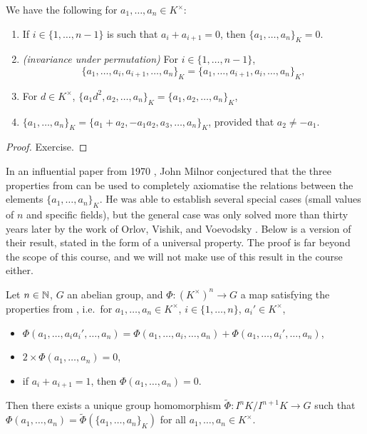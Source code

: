 \documentclass[12pt, leqno, british]{amsart}
\begin{document}
\begin{cor}\label{C:K-theory-axioms}
We have the following for $a_1, \ldots, a_n \in K^\times$:
\begin{enumerate}
\item If $i \in \lbrace 1, \ldots, n-1 \rbrace$ is such that $a_i + a_{i+1} = 0$, then $\lbrace a_1, \ldots, a_n \rbrace_K = 0$.
\item\label{it:permutation-invariance} \textit{(invariance under permutation)} For $i \in \lbrace 1, \ldots, n-1 \rbrace$, $$\lbrace a_1, \ldots, a_i, a_{i+1}, \ldots, a_n \rbrace_K = \lbrace a_1, \ldots, a_{i+1}, a_i, \ldots, a_n \rbrace_K,$$
\item\label{it:scale-square-invariance} For $d \in K^\times$, $\lbrace a_1d^2, a_2, \ldots, a_n \rbrace_K = \lbrace a_1, a_2, \ldots, a_n \rbrace_K$,
\item $\lbrace a_1, \ldots, a_n \rbrace_K = \lbrace a_1 + a_2, -a_1a_2, a_3, \ldots, a_n \rbrace_K$, provided that $a_2 \neq -a_1$.
\end{enumerate}
\end{cor}
\begin{proof}
Exercise.
\end{proof}
In an influential paper from 1970 \cite{Milnor}, John Milnor conjectured that the three properties from  can be used to completely axiomatise the relations between the elements $\lbrace a_1, \ldots, a_n \rbrace_K$.
He was able to establish several special cases (small values of $n$ and specific fields), but the general case was only solved more than thirty years later by the work of Orlov, Vishik, and Voevodsky \cite{OrlovVishikVoevodsky}.
Below is a version of their result, stated in the form of a universal property.
The proof is far beyond the scope of this course, and we will not make use of this result in the course either.
\begin{thm}
Let $n \in \mathbb N$, $G$ an abelian group, and $\Phi : (K^\times)^n \to G$ a map satisfying the properties from , i.e.~for $a_1, \ldots, a_n \in K^\times$, $i \in \lbrace 1, \ldots, n \rbrace$, $a_i' \in K^\times$,
\begin{itemize}
\item $\Phi(a_1, \ldots, a_ia_i', \ldots, a_n) = \Phi(a_1, \ldots, a_i, \ldots, a_n) + \Phi(a_1, \ldots, a_i', \ldots, a_n)$,
\item $2 \times \Phi(a_1, \ldots, a_n) = 0$,
\item if $a_i + a_{i+1} = 1$, then $\Phi(a_1, \ldots, a_n) = 0$.
\end{itemize}
Then there exists a unique group homomorphism $\tilde{\Phi} : I^nK/I^{n+1}K \to G$ such that $\Phi(a_1, \ldots, a_n) = \tilde{\Phi}(\lbrace a_1, \ldots, a_n \rbrace_K)$ for all $a_1, \ldots, a_n \in K^\times$.
\end{thm}
\end{document}
